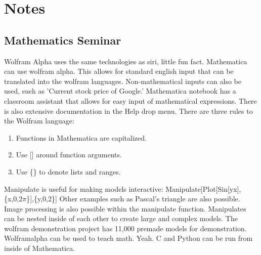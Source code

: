 \documentclass[crop=false,class=book]{standalone}
\begin{document}
\section{Notes}
\subsection{Mathematics Seminar}
Wolfram Alpha uses the same technologies as siri, little fun fact. Mathematica can use wolfram alpha. This allows for standard english input that can be translated into the wolfram languages.
Non-mathematical inputs can also be used, such as 'Current stock price of Google.'
Mathematica notebook has a classroom assistant that allows for easy input of mathematical expressions. There is also extensive documentation in the Help drop menu. There are three rules to the Wolfram language:
\begin{enumerate}
    \item Functions in Mathematica are capitalized.
    \item Use [] around function arguments.
    \item Use \{\} to denote lists and ranges.
\end{enumerate}
Manipulate is useful for making models interactive: Manipulate[Plot[Sin[yx],\{x,0,2$\pi$\}],\{y,0,2\}]
Other examples such as Pascal's triangle are also possible. Image processing is also possible within the manipulate function. Manipulates can be nested inside of each other to create large and complex models. The wolfram demonstration project has 11,000 premade models for demonstration. Wolframalpha can be used to teach math. Yeah.
C and Python can be run from inside of Mathematica.
\end{document}

